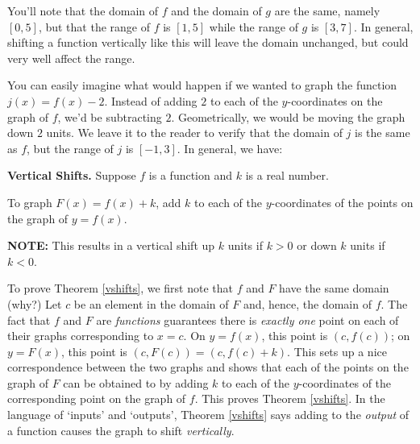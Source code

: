 \documentclass{ximera}
\begin{document}
You'll note that the domain of $f$ and the domain of $g$ are the same, namely $[0,5]$, but that the range of $f$ is $[1,5]$ while the range of $g$ is $[3,7]$.  In general, shifting a function vertically like this will leave the domain unchanged, but could very well affect the range.  

\smallskip

You can easily imagine what would happen if we wanted to graph the function $j(x) = f(x) - 2$.  Instead of adding $2$ to each of the $y$-coordinates on the graph of $f$, we'd be subtracting $2$.  Geometrically, we would be moving the graph down $2$ units.  We leave it to the reader to verify that the domain of $j$ is the same as $f$, but the range of $j$ is $[-1,3]$.  In general, we have:

\smallskip

\colorbox{ResultColor}{\bbm


\begin{theorem} \label{vshifts} \textbf{Vertical Shifts.} Suppose $f$ is a function and $k$ is a real number. 

To graph $F(x) = f(x) + k$,  add $k$ to each of the $y$-coordinates of the points on the graph of $y=f(x)$.

\textbf{NOTE:}  This results in a vertical shift up $k$ units if $k > 0$ or down $k$ units if $k< 0$.


\end{theorem}

\ebm}

\smallskip

To prove Theorem \ref{vshifts}, we first note that $f$ and $F$ have the same domain (why?)  Let $c$ be an element in the domain of $F$ and, hence, the domain of $f$.  The fact that $f$ and $F$ are \textit{functions} guarantees  there is \textit{exactly one} point on each of their  graphs corresponding to $x=c$.  On $y=f(x)$, this point is $(c, f(c))$;  on $y = F(x)$, this point is  $(c, F(c)) = (c, f(c)+k)$.  This sets up a nice correspondence between the two graphs and shows that each of the points on the graph of $F$ can be obtained to by adding $k$ to each of the $y$-coordinates of the corresponding point on the graph  of $f$.  This  proves  Theorem \ref{vshifts}.   In the language of `inputs' and `outputs', Theorem \ref{vshifts} says adding to the \textit{output} of a function causes the graph to shift \textit{vertically}. 
 
\smallskip
\end{document}
